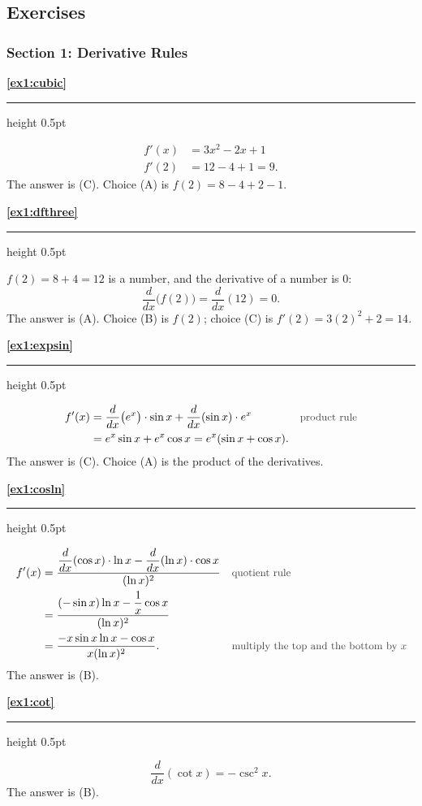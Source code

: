 \documentclass[11pt,a4paper]{article}
\newcommand{\solitem}[2]{%
 \par\addvspace{16pt}\Needspace{10\baselineskip}%
 {\large\bfseries \ref{#1}}\par\nobreak\vspace{2pt}%
 {\color{rulegray}\hrule height 0.5pt}\nobreak\vspace{7pt}%
 #2\par}
\newcommand{\why}[1]{\text{\small\color{darkgray}#1}}
\begin{document}
\subsection*{Exercises}
\subsubsection*{Section 1: Derivative Rules}
\solitem{ex1:cubic}{%
\begin{align*}
f'(x)&=3x^2-2x+1\\
f'(2)&=12-4+1=9.
\end{align*}
The answer is (C). Choice (A) is $f(2)=8-4+2-1$.
}

\solitem{ex1:dfthree}{%
$f(2)=8+4=12$ is a number, and the derivative of a number is $0$:
\[
\frac{d}{dx}\bigl(f(2)\bigr)=\frac{d}{dx}(12)=0.
\]
The answer is (A). Choice (B) is $f(2)$; choice (C) is $f'(2)=3(2)^2+2=14$.
}

\solitem{ex1:expsin}{%
\begin{align*}
f'(x)&=\frac{d}{dx}\bigl(e^x\bigr)\cdot\sin x+\frac{d}{dx}(\sin x)\cdot e^x &&\why{product rule}\\
&=e^x\sin x+e^x\cos x=e^x(\sin x+\cos x).
\end{align*}
The answer is (C). Choice (A) is the product of the derivatives.
}

\solitem{ex1:cosln}{%
\begin{align*}
f'(x)&=\frac{\dfrac{d}{dx}(\cos x)\cdot\ln x-\dfrac{d}{dx}(\ln x)\cdot\cos x}{(\ln x)^2} &&\why{quotient rule}\\
&=\frac{(-\sin x)\ln x-\dfrac1x\cos x}{(\ln x)^2}\\
&=\frac{-x\sin x\ln x-\cos x}{x(\ln x)^2}. &&\why{multiply the top and the bottom by $x$}
\end{align*}
The answer is (B).
}

\solitem{ex1:cot}{%
\[
\frac{d}{dx}(\cot x)=-\csc^2x.
\]
The answer is (B).
}
\end{document}
